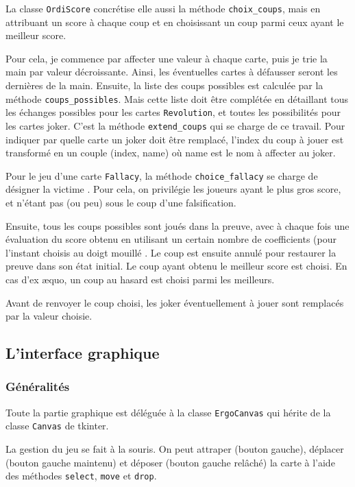\documentclass[12pt, algo]{cours}
\begin{document}
La classe \texttt{OrdiScore} concrétise elle aussi la méthode \texttt{choix\_coups}, mais en attribuant un score à chaque coup et en choisissant un coup parmi ceux ayant le meilleur score.

Pour cela, je commence par affecter une valeur à chaque carte, puis je trie la main par valeur décroissante. Ainsi, les éventuelles cartes à défausser seront les dernières de la main. Ensuite, la liste des coups possibles est calculée par la méthode \texttt{coups\_possibles}. Mais cette liste doit être complétée en détaillant tous les échanges possibles pour les cartes \texttt{Revolution}, et toutes les possibilités pour les cartes joker. C'est la méthode \texttt{extend\_coups} qui se charge de ce travail. Pour indiquer par quelle carte un joker doit être remplacé, l'index du coup à jouer est transformé en un couple (index, name) où name est le nom à affecter au joker.

Pour le jeu d'une carte \texttt{Fallacy}, la méthode \texttt{choice\_fallacy} se charge de désigner la \og victime \fg. Pour cela, on privilégie les joueurs ayant le plus gros score, et n'étant pas (ou peu) sous le coup d'une falsification.

Ensuite, tous les coups possibles sont joués dans la preuve, avec à chaque fois une évaluation du score obtenu en utilisant un certain nombre de coefficients (pour l'instant choisis au \og doigt mouillé \fg. Le coup est ensuite annulé pour restaurer la preuve dans son état initial. Le coup ayant obtenu le meilleur score est choisi. En cas d'ex \ae quo, un coup au hasard est choisi parmi les meilleurs.

Avant de renvoyer le coup choisi, les joker éventuellement à jouer sont remplacés par la valeur choisie.

\subsection{L'interface graphique}

\subsubsection{Généralités}

Toute la partie graphique est déléguée à la classe \texttt{ErgoCanvas} qui hérite de la classe \texttt{Canvas} de tkinter. 

La gestion du jeu se fait à la souris. On peut attraper (bouton gauche), déplacer (bouton gauche maintenu) et déposer (bouton gauche relâché) la carte à l'aide des méthodes \texttt{select}, \texttt{move} et \texttt{drop}.
\end{document}
